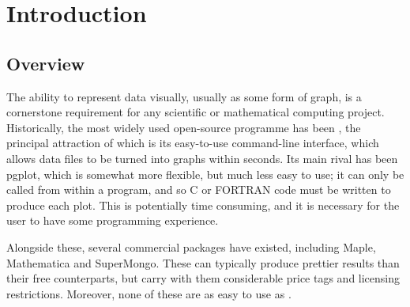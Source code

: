 %
%
%
%
%



\chapter{Introduction}

\label{introduction}

\section{Overview}

The ability to represent data visually, usually as some form of graph, is a
cornerstone requirement for any scientific or mathematical computing project.
Historically, the most widely used open-source programme has been {\sc
\gnuplot}, the principal attraction of which is its easy-to-use
command-line interface, which allows data files to be turned into graphs within
seconds. Its main rival has been {\sc pgplot}, which is somewhat
more flexible, but much less easy to use; it can only be called from within a
program, and so C or FORTRAN code must be written to produce each plot. This is
potentially time consuming, and it is necessary for the user to have some
programming experience.

Alongside these, several commercial packages have existed, including {\sc
Maple}, {\sc Mathematica} and {\sc
SuperMongo}.  These can typically produce prettier results
than their free counterparts, but carry with them considerable price tags and
licensing restrictions. Moreover, none of these are as easy to use as \gnuplot.

